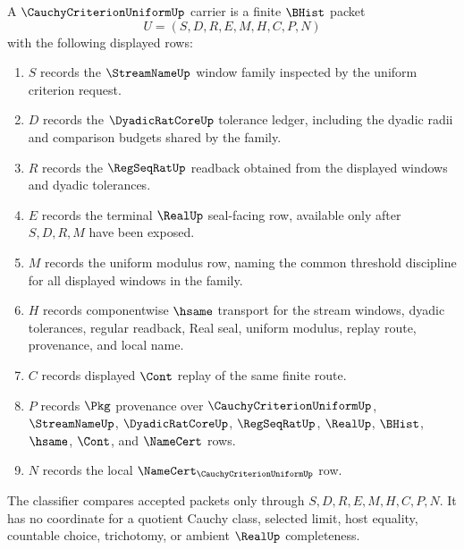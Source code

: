 \begin{definition}
\label{def:cauchy-criterion-uniform-carrier}
A $\CauchyCriterionUniformUp$ carrier is a finite $\BHist$ packet
$$
U=(S,D,R,E,M,H,C,P,N)
$$
with the following displayed rows:
\begin{enumerate}
\item $S$ records the $\StreamNameUp$ window family inspected by the uniform criterion request.
\item $D$ records the $\DyadicRatCoreUp$ tolerance ledger, including the dyadic radii and comparison budgets shared by the family.
\item $R$ records the $\RegSeqRatUp$ readback obtained from the displayed windows and dyadic tolerances.
\item $E$ records the terminal $\RealUp$ seal-facing row, available only after $S,D,R,M$ have been exposed.
\item $M$ records the uniform modulus row, naming the common threshold discipline for all displayed windows in the family.
\item $H$ records componentwise $\hsame$ transport for the stream windows, dyadic tolerances, regular readback, Real seal, uniform modulus, replay route, provenance, and local name.
\item $C$ records displayed $\Cont$ replay of the same finite route.
\item $P$ records $\Pkg$ provenance over $\CauchyCriterionUniformUp$, $\StreamNameUp$, $\DyadicRatCoreUp$, $\RegSeqRatUp$, $\RealUp$, $\BHist$, $\hsame$, $\Cont$, and $\NameCert$ rows.
\item $N$ records the local $\NameCert_{\CauchyCriterionUniformUp}$ row.
\end{enumerate}
The classifier compares accepted packets only through $S,D,R,E,M,H,C,P,N$. It has no coordinate for a quotient Cauchy class, selected limit, host equality, countable choice, trichotomy, or ambient $\RealUp$ completeness.
\end{definition}

